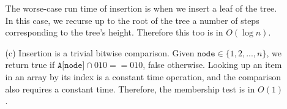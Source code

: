 \documentclass{article}
\begin{document}
\begin{enumerate}
\begin{enumerate}
            The worse-case run time of insertion is when we insert a leaf of the tree. In this case, we recurse up to the root of the tree a number of steps corresponding to the tree's height. Therefore this too is in $O(\log n)$.

        \item [(c)] Insertion is a trivial bitwise comparison. Given $\texttt{node} \in \{1, 2, ..., n\}$, we return true if $\texttt{A[node]} \cap 010 == 010$, false otherwise. Looking up an item in an array by its index is a constant time operation, and the comparison also requires a constant time. Therefore, the membership test is in $O(1)$.
    \end{enumerate}
\end{enumerate}
\end{document}
